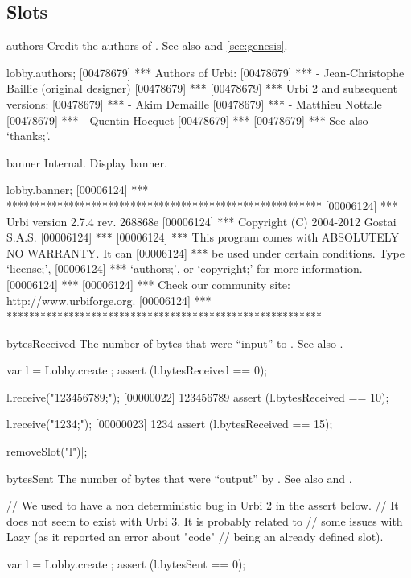 \subsection{Slots}
\begin{urbiscriptapi}
\item[authors] Credit the authors of \usdk.  See also  and
  \autoref{sec:genesis}.
\begin{urbiscript}
lobby.authors;
[00478679] *** Authors of Urbi:
[00478679] ***  - Jean-Christophe Baillie (original designer)
[00478679] ***
[00478679] *** Urbi 2 and subsequent versions:
[00478679] ***  - Akim Demaille
[00478679] ***  - Matthieu Nottale
[00478679] ***  - Quentin Hocquet
[00478679] ***
[00478679] *** See also `thanks;'.
\end{urbiscript}


\item[banner] Internal.  Display \usdk banner.
\begin{urbiscript}
lobby.banner;
[00006124] *** ********************************************************
[00006124] *** Urbi version 2.7.4 rev. 268868e
[00006124] *** Copyright (C) 2004-2012 Gostai S.A.S.
[00006124] ***
[00006124] *** This program comes with ABSOLUTELY NO WARRANTY.  It can
[00006124] *** be used under certain conditions.  Type `license;',
[00006124] *** `authors;', or `copyright;' for more information.
[00006124] ***
[00006124] *** Check our community site: http://www.urbiforge.org.
[00006124] *** ********************************************************
\end{urbiscript}


\item[bytesReceived] The number of bytes that were ``input'' to \this.  See
  also .
\begin{urbiscript}
var l = Lobby.create|;
assert (l.bytesReceived == 0);

l.receive("123456789;");
[00000022] 123456789
assert (l.bytesReceived == 10);

l.receive("1234;");
[00000023] 1234
assert (l.bytesReceived == 15);
\end{urbiscript}
\begin{urbicomment}
removeSlot("l")|;
\end{urbicomment}


\item[bytesSent] The number of bytes that were ``output'' by \this.  See
  also  and .
\begin{urbicomment}
// We used to have a non deterministic bug in Urbi 2 in the assert below.
// It does not seem to exist with Urbi 3.  It is probably related to
// some issues with Lazy (as it reported an error about "code"
// being an already defined slot).
\end{urbicomment}
\begin{urbiscript}
var l = Lobby.create|;
assert (l.bytesSent == 0);


\end{urbiscript}
\end{urbiscriptapi}
